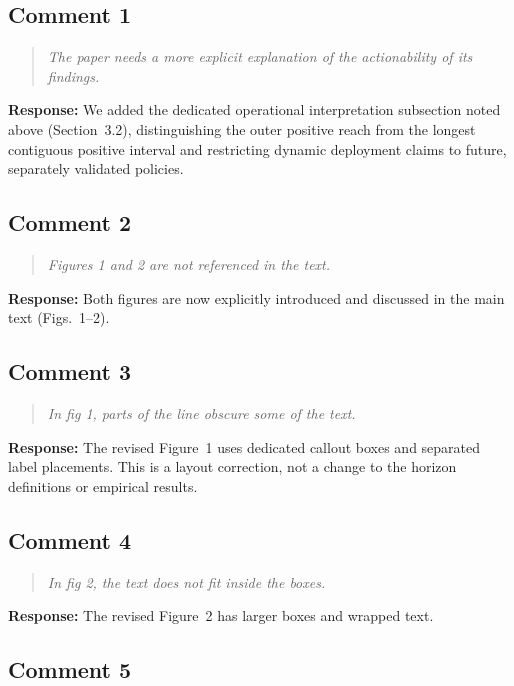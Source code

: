 \documentclass[11pt,a4paper]{article}
\let\originalsubsection\subsection
\renewcommand{\subsection}{\Needspace{9\baselineskip}\originalsubsection}
\newenvironment{reviewcomment}
  {\begin{quote}\itshape}
  {\end{quote}}
\newcommand{\response}{\noindent\textbf{Response:} }
\begin{document}
\subsection*{Comment 1}

\begin{reviewcomment}
The paper needs a more explicit explanation of the actionability of its findings.
\end{reviewcomment}

\response
We added the dedicated operational interpretation subsection noted above
(Section~3.2), distinguishing the outer positive reach from the longest
contiguous positive interval and restricting dynamic deployment claims to
future, separately validated policies.


\subsection*{Comment 2}

\begin{reviewcomment}
Figures 1 and 2 are not referenced in the text.
\end{reviewcomment}

\response
Both figures are now explicitly introduced and discussed in the main text
(Figs.~1--2).


\subsection*{Comment 3}

\begin{reviewcomment}
In fig 1, parts of the line obscure some of the text.
\end{reviewcomment}

\response
The revised Figure~1 uses dedicated callout boxes and separated label
placements. This is a layout correction, not a change to the horizon
definitions or empirical results.


\subsection*{Comment 4}

\begin{reviewcomment}
In fig 2, the text does not fit inside the boxes.
\end{reviewcomment}

\response
The revised Figure~2 has larger boxes and wrapped text.


\subsection*{Comment 5}
\end{document}
